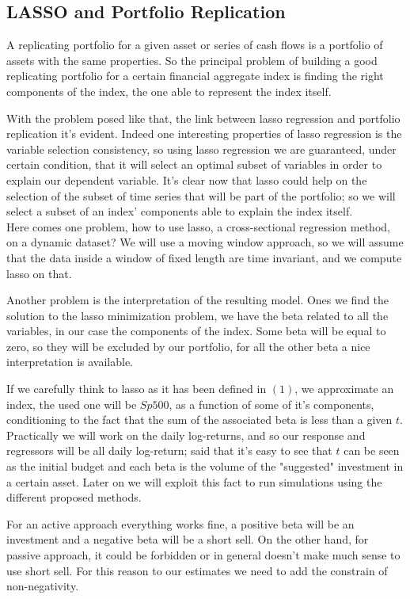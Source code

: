 \documentclass{article}%
\begin{document}
\subsection{LASSO and Portfolio Replication}

A replicating portfolio for a given asset or series of cash flows is a portfolio of assets with the same properties. So the principal problem of building a good replicating portfolio for a certain financial aggregate index is finding the right components of the index, the one able to represent the index itself. 

With the problem posed like that, the link between lasso regression and portfolio replication it's evident. Indeed one interesting properties of lasso regression is the variable selection consistency, so using lasso regression we are guaranteed, under certain condition, that it will select an optimal subset of variables in order to explain our dependent variable. It's clear now that lasso could help on the selection of the subset of time series that will be part of the portfolio; so we will select a subset of an index' components  able to explain the index itself.
\\

Here comes one problem, how to use lasso, a cross-sectional regression method, on a dynamic dataset? We will use a moving window approach, so we will assume that the data inside a window of fixed length are time invariant, and we compute lasso on that.

Another problem is the interpretation of the resulting model. Ones we find the solution to the lasso minimization problem, we have the beta related to all the variables, in our case the components of the index. Some beta will be equal to zero, so they will be excluded by our portfolio, for all the other beta a nice interpretation is available. 

If we carefully think to lasso as it has been defined in $(1)$, we approximate an index, the used one will be $Sp500$, as a function of some of it's components, conditioning to the fact that the sum of the associated beta is less than a given $t$. Practically we will work on the daily log-returns, and so our response and regressors will be all daily log-return; said that it's easy to see that $t$ can be seen as the initial budget and each beta is the volume of the "suggested" investment in a certain asset. Later on we will exploit this fact to run simulations using the different proposed methods.

For an active approach everything works fine, a positive beta will be an investment and a negative beta will be a short sell. On the other hand, for passive approach, it could be forbidden or in general doesn't make much sense to use short sell. For this reason to our estimates we need to add the constrain of non-negativity.
\\
\end{document}
